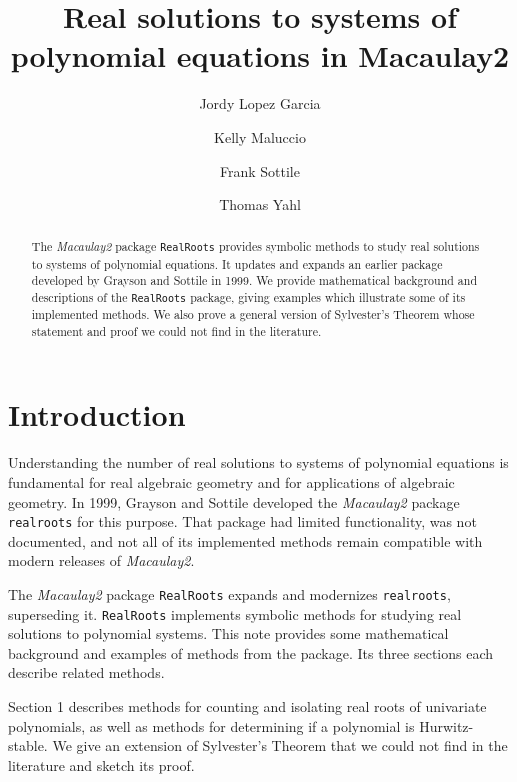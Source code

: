 \documentclass[12pt]{amsart}
\title{Real solutions to systems of polynomial equations in Macaulay2}
\author[J.~Lopez Garcia]{Jordy Lopez Garcia}
\author[K.~Maluccio]{Kelly Maluccio}
\author[F.~Sottile]{Frank Sottile}
\author[T.~Yahl]{Thomas Yahl}
\theoremstyle{definition}
\begin{document}
\begin{abstract}
 The \textit{Macaulay2} package \texttt{RealRoots} provides symbolic methods to study real solutions to systems of polynomial equations.
 It updates and expands an earlier package developed by Grayson and Sottile in 1999.
 We provide mathematical background and descriptions of the  \texttt{RealRoots} package, giving examples which illustrate some of its
 implemented methods.
 We also prove a general version of Sylvester's Theorem whose statement and proof we could not find in the literature.
\end{abstract}

\maketitle


\section*{Introduction}


Understanding the number of real solutions to systems of polynomial equations is fundamental for real algebraic geometry and for
applications of algebraic geometry.
In 1999, Grayson and Sottile \cite{So_M2} developed the \textit{Macaulay2} package \texttt{realroots} for this purpose.
That package had limited functionality, was not documented, and not all of its implemented methods remain compatible with
modern releases of \textit{Macaulay2}. 

The \textit{Macaulay2} package \texttt{RealRoots} expands and modernizes \texttt{realroots}, superseding it.
\texttt{RealRoots} implements symbolic methods for studying real solutions to polynomial systems.
This note provides some mathematical background and examples of methods from the package.
Its  three sections each describe related methods.


Section 1 describes methods for counting and isolating real roots of univariate polynomials, as well as methods for determining if a
polynomial is Hurwitz-stable.
We give an extension of Sylvester's Theorem that we could not find in the literature and sketch its proof.
\end{document}
